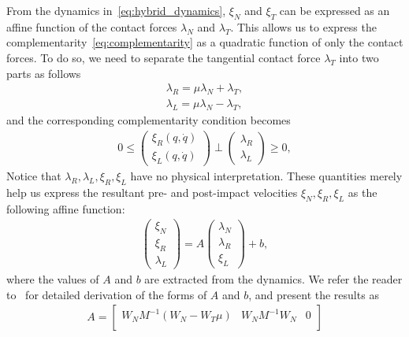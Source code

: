 {From the dynamics in~\eqref{eq:hybrid_dynamics}, $\xi_N$ and $\xi_T$ can be
expressed as an affine function of the contact forces $\lambda_N$ and
$\lambda_T$. This allows us to express the
complementarity~\eqref{eq:complementarity} as a quadratic function of only the
contact forces. To do so, we need to separate the tangential contact force
$\lambda_T$ into two parts as follows~\cite{glocker2005formulation}
\begin{align*}
  \lambda_R = \mu \lambda_N + \lambda_T, \\
  \lambda_L = \mu \lambda_N - \lambda_T, 
\end{align*}
\noindent and the corresponding complementarity condition becomes
%
\begin{equation*}
  \begin{gathered}
    0 \leq 
    \begin{pmatrix}
      \xi_R(q, \dot{q}) \\
      \xi_L(q, \dot{q})
    \end{pmatrix} 
    \perp
      \begin{pmatrix}
        \lambda_R  \\
        \lambda_L
      \end{pmatrix} \geq 0,
    \end{gathered}
\end{equation*}
Notice that $\lambda_R, \lambda_L, \xi_R, \xi_L$ have no physical interpretation.
%
These quantities merely help us express the resultant pre- and post-impact
velocities $\xi_N, \xi_R, \xi_L$ as the following affine function: 
\begin{align*}
  \begin{pmatrix}
    \xi_N \\
    \xi_R \\
    \lambda_L
  \end{pmatrix} =
      A
    \begin{pmatrix}
      \lambda_N \\
      \lambda_R \\
      \xi_L
    \end{pmatrix} + b, 
\end{align*}
\noindent where the values of $A$ and $b$ are extracted from the dynamics. We
refer the reader to~\cite{glocker2005formulation} for detailed derivation of the
forms of $A$ and $b$, and present the results as
\begin{gather*}
    A = \begin{bmatrix}
      W_N M^{-1} (W_N - W_T \mu) & W_N M^{-1} W_N & 0  \\

\end{bmatrix}
\end{gather*}}

